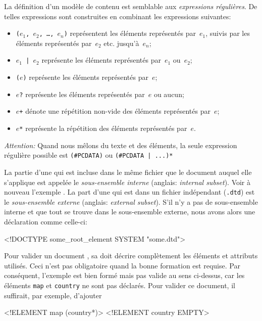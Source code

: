 La définition d'un modèle de contenu est semblable aux
\emph{expressions régulières}. De telles expressions sont construites
en combinant les expressions suivantes:
\begin{itemize}

  \item \texttt{(\(e_1\), \(e_2\), \dots, \(e_n\))} représentent les
    éléments représentés par~\(e_1\), suivis par les éléments
    représentés par~\(e_2\) etc. jusqu'à~\(e_n\);

  \item \texttt{\(e_1\) | \(e_2\)} représente les éléments représentés
    par~\(e_1\) ou~\(e_2\);

  \item \texttt{(\(e\))} représente les éléments représentés par~\(e\);

  \item \texttt{\(e\)?} représente les éléments représentés par~\(e\)
    ou aucun;

  \item \texttt{\(e\)+} dénote une répétition non-vide des
    éléments représentés par~\(e\);

  \item \texttt{\(e\)*} représente la répétition des éléments
    représentés par~\(e\).

\end{itemize}
\emph{Attention:} Quand nous mêlons du texte et des éléments, la seule
expression régulière possible est \verb|(#PCDATA)| ou
\verb/(#PCDATA | ...)*/

La partie d'une \DTD qui est incluse dans le même fichier que le
document \XML auquel elle s'applique est appelée le
\emph{sous-ensemble interne} (anglais: \emph{internal subset}). Voir à
nouveau l'exemple . La part d'une \DTD
qui est dans un fichier indépendant (\texttt{.dtd}) est le
\emph{sous-ensemble externe} (anglais: \emph{external subset}). S'il
n'y a pas de sous-ensemble interne et que tout se trouve dans le
sous-ensemble externe, nous avons alors une déclaration comme
celle-ci:
\begin{sverb}
<!DOCTYPE some_root_element SYSTEM "some.dtd">
\end{sverb}
Pour valider un document \XML, sa \DTD doit décrire complètement les
éléments et attributs utilisés. Ceci n'est pas obligatoire quand la
bonne formation est requise. Par conséquent, l'exemple
 est bien formé mais pas valide au sens
ci-dessus, car les éléments \texttt{map} et \texttt{country} ne sont
pas déclarés. Pour valider ce document, il suffirait, par exemple,
d'ajouter
\begin{sverb}
<!ELEMENT map (country*)>
<!ELEMENT country EMPTY>
\end{sverb}


